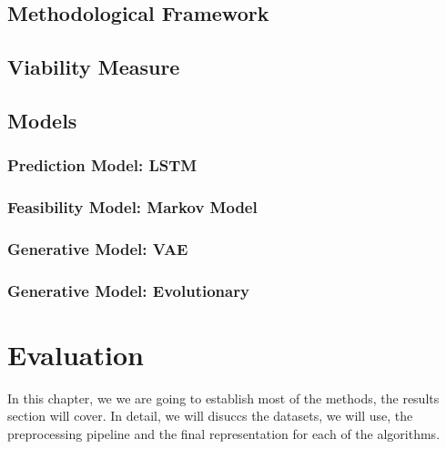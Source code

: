 \documentclass[12pt,a4paper]{report}
\begin{document}
\section{Methodological Framework}
\label{sec:framework}




\section{Viability Measure}
\label{sec:viability}

 

\section{Models}
\label{sec:models}

\subsection{Prediction Model: LSTM}
\label{sec:model_prediction}


\subsection{Feasibility Model: Markov Model}
\label{sec:model_feasibility}


\subsection{Generative Model: VAE}
\label{sec:model_vae}


\subsection{Generative Model: Evolutionary}
\label{sec:model_evolutionary}


\chapter{Evaluation}
\label{sec:datasets}
In this chapter, we we are going to establish most of the methods, the results section will cover. In detail, we will disuccs the datasets, we will use, the preprocessing pipeline and the final representation for each of the algorithms.

\end{document}
